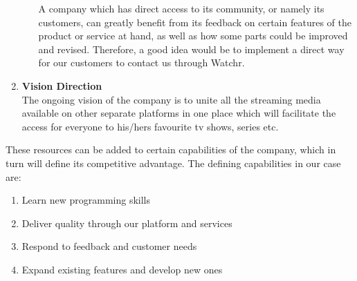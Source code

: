 \begin{enumerate}
\begin{enumerate}
A company which has direct access to its community, or namely its customers, can greatly benefit from its feedback on certain features of the product or service at hand, as well as how some parts could be improved and revised. Therefore, a good idea would be to implement a direct way for our customers to contact us through Watchr.
    \end{enumerate}
  \item \textbf{Vision Direction}\\
The ongoing vision of the company is to unite all the streaming media available on other separate platforms in one place which will facilitate the access for everyone to his/hers favourite tv shows, series etc.
\end{enumerate}

These resources can be added to certain capabilities of the company, which in turn will define its competitive advantage. The defining capabilities in our case are:

\begin{enumerate}
  \item Learn new programming skills
  \item Deliver quality through our platform and services
  \item Respond to feedback and customer needs
  \item Expand existing features and develop new ones
\end{enumerate}